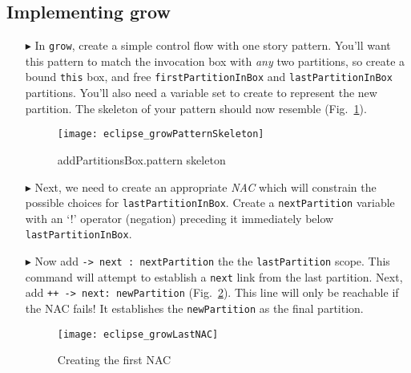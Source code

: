 \clearpage
\hypertarget{growBox tex}{}
\subsection{Implementing grow}
\texHeader

\vspace*{0.5cm}

\begin{itemize}

\item[$\blacktriangleright$] In \texttt{grow}, create a simple control flow with one story pattern. You'll want this pattern to match the invocation box with
\emph{any} two partitions, so create a bound \texttt{this} box, and free \texttt{firstPartitionInBox} and \texttt{lastPartitionInBox} partitions.
You'll also need a variable set to create to represent the new partition. The skeleton of your pattern should now resemble (Fig.~\ref{fig:growPattSkel}).

\vspace{0.5cm}

\begin{figure}[htbp]
\begin{center}
  \texttt{[image: eclipse\_growPatternSkeleton]}
  \caption{addPartitionsBox.pattern skeleton}
  \label{fig:growPattSkel}
\end{center}
\end{figure}

\item[$\blacktriangleright$] Next, we need to create an appropriate \emph{NAC} which will constrain the possible choices for \texttt{lastPartitionInBox}.
Create a \texttt{nextPartition} variable with an `!' operator (negation) preceding it immediately below \texttt{last\-Part\-it\-ion\-In\-Box}.

\vspace{0.5cm}

\item[$\blacktriangleright$] Now add \texttt{-> next : nextPartition} the the \texttt{lastPartition} scope. This
command will attempt to establish a \texttt{next} link from the last partition. Next, add \texttt{++ -> next: newPartition} (Fig.~\ref{fig:firstNAC}).
This line will only be reachable if the NAC fails! It establishes the \texttt{newPartition} as the final partition.

\begin{figure}[htbp]
\begin{center}
  \texttt{[image: eclipse\_growLastNAC]}
  \caption{Creating the first NAC}
  \label{fig:firstNAC}
\end{center}
\end{figure}


\end{itemize}

